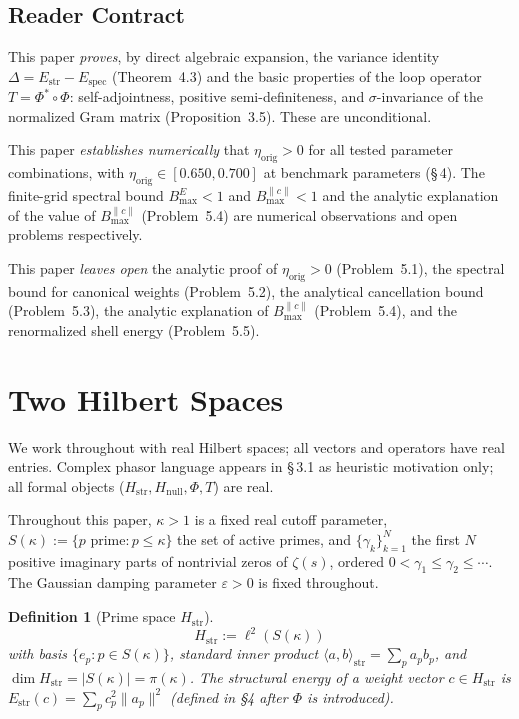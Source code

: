 \documentclass[11pt]{article}
\newtheorem{definition}[theorem]{Definition}
\newcommand{\Hstr}{H_{\mathrm{str}}}
\newcommand{\Hnull}{H_{\mathrm{null}}}
\newcommand{\Estr}{E_{\mathrm{str}}}
\newcommand{\Espec}{E_{\mathrm{spec}}}
\newcommand{\etaorig}{\eta_{\mathrm{orig}}}
\begin{document}
\subsection{Reader Contract}

This paper \emph{proves}, by direct algebraic expansion, the
variance identity $\Delta=\Estr-\Espec$ (Theorem~4.3) and the basic
properties of the loop operator $T=\Phi^*\circ\Phi$: self-adjointness,
positive semi-definiteness, and $\sigma$-invariance of the normalized
Gram matrix (Proposition~3.5). These are unconditional.

This paper \emph{establishes numerically} that $\etaorig>0$ for all
tested parameter combinations, with
$\etaorig\in[0.650,0.700]$ at benchmark parameters (\S\,4).
The finite-grid spectral bound $B^E_{\max}<1$ and $B^{\|c\|}_{\max}<1$ and the
analytic explanation of the value of $B^{\|c\|}_{\max}$ (Problem~5.4)
are numerical observations and open problems respectively.

This paper \emph{leaves open} the analytic proof of $\etaorig>0$
(Problem~5.1), the spectral bound for canonical weights
(Problem~5.2), the analytical cancellation bound (Problem~5.3),
the analytic explanation of $B^{\|c\|}_{\max}$ (Problem~5.4), and the
renormalized shell energy (Problem~5.5).

\section{Two Hilbert Spaces}

We work throughout with real Hilbert spaces; all vectors and operators have
real entries. Complex phasor language appears in \S\,3.1 as
heuristic motivation only; all formal objects ($\Hstr, \Hnull, \Phi, T$)
are real.

Throughout this paper, $\kappa>1$ is a fixed real cutoff parameter,
$S(\kappa):=\{p\text{ prime}:p\leq\kappa\}$ the set of active primes,
and $\{\gamma_k\}_{k=1}^N$ the first $N$ positive imaginary parts of
nontrivial zeros of $\zeta(s)$, ordered $0<\gamma_1\leq\gamma_2\leq\cdots$.
The Gaussian damping parameter $\varepsilon>0$ is fixed throughout.

\begin{definition}[Prime space $\Hstr$]
\[
\Hstr := \ell^2(S(\kappa))
\]
with basis $\{e_p : p\in S(\kappa)\}$, standard inner product
$\langle a,b\rangle_{\mathrm{str}}=\sum_p a_p b_p$, and
$\dim\Hstr=|S(\kappa)|=\pi(\kappa)$.
The \emph{structural energy} of a weight vector $c\in\Hstr$ is
$\Estr(c)=\sum_p c_p^2\|a_p\|^2$ (defined in \S4 after $\Phi$ is introduced).
\end{definition}
\end{document}
